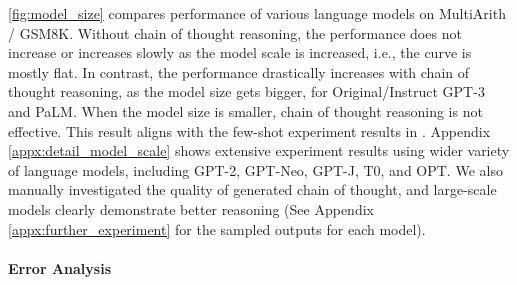 \documentclass{article}
\newcommand{\CoT}{chain of thought\xspace}
\begin{document}
\autoref{fig:model_size} compares performance of various language models on MultiArith / GSM8K. 
Without \CoT reasoning, the performance does not increase or increases slowly as the model scale is increased, i.e., the curve is mostly flat. 
In contrast, the performance drastically increases with \CoT reasoning, as the model size gets bigger, for Original/Instruct GPT-3 and PaLM. When the model size is smaller, \CoT reasoning is not effective. 
This result aligns with the few-shot experiment results in \cite{cot_wei}.
Appendix \ref{appx:detail_model_scale} shows extensive experiment results using wider variety of language models, including GPT-2, GPT-Neo, GPT-J, T0, and OPT.
We also manually investigated the quality of generated \CoT, and large-scale models clearly demonstrate better reasoning (See Appendix \ref{appx:further_experiment} for the sampled outputs for each model).

\paragraph{Error Analysis}
\end{document}
